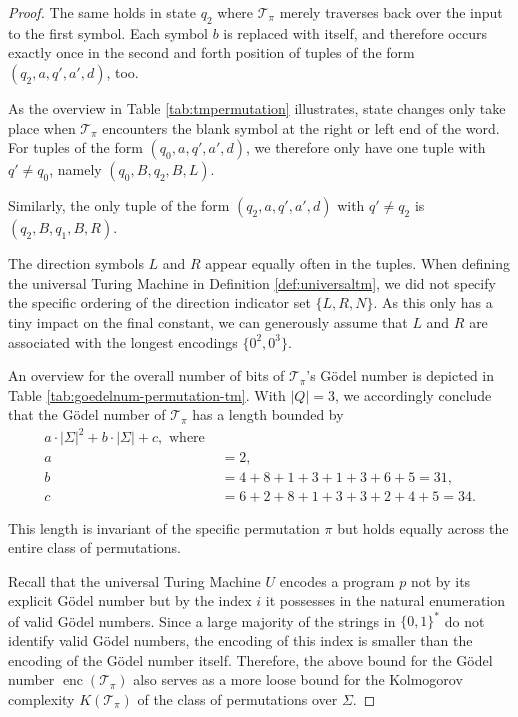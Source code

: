 \begin{proof}
	The same holds in state $q_2$ where $\mathcal{T}_\pi$ merely traverses back over the input to the first symbol. Each symbol $b$ is replaced with itself, and therefore occurs exactly once in the second and forth position of tuples of the form $(q_2,a,q',a',d)$, too.
	
	As the overview in Table \ref{tab:tmpermutation} illustrates, state changes only take place when $\mathcal{T}_\pi$ encounters the blank symbol at the right or left end of the word. For tuples of the form $(q_0,a,q',a',d)$, we therefore only have one tuple with $q'\neq q_0$, namely $(q_0,B,q_2,B,L)$.
	
	Similarly, the only tuple of the form $(q_2,a,q',a',d)$ with $q'\neq q_2$ is $(q_2,B,q_1,B,R)$.
	
	The direction symbols $L$ and $R$ appear equally often in the tuples.
	When defining the universal Turing Machine in Definition \ref{def:universaltm}, we did not specify the specific ordering of the direction indicator set $\{L,R,N\}$. As this only has a tiny impact on the final constant, we can generously assume that $L$ and $R$ are associated with the longest encodings $\{0^2,0^3\}$.
	
	An overview for the overall number of bits of $\mathcal{T}_\pi$'s G\"odel number is depicted in Table \ref{tab:goedelnum-permutation-tm}.
	With $|Q|=3$, we accordingly conclude that the G\"odel number of $\mathcal{T}_\pi$ has a length bounded by
	\begin{align}
		a\cdot |\Sigma|^2+b\cdot|\Sigma|+c, \text{ where } &\\
		a&=2,\\
		b&=4+8+1+3+1+3+6+5=31,\\
		c&=6+2+8+1+3+3+2+4+5=34.
	\end{align}
	
	This length is invariant of the specific permutation $\pi$ but holds equally across the entire class of permutations.
	
	Recall that the universal Turing Machine $U$ encodes a program $p$ not by its explicit G\"odel number but by the index $i$ it possesses in the natural enumeration of valid G\"odel numbers.
	Since a large majority of the strings in $\{0,1\}^{*}$ do not identify valid G\"odel numbers, the encoding of this index is smaller than the encoding of the G\"odel number itself.
	Therefore, the above bound for the G\"odel number $\operatorname{enc}(\mathcal{T}_\pi)$ also serves as a more loose bound for the Kolmogorov complexity $K(\mathcal{T}_\pi)$ of the class of permutations over $\Sigma$.
\end{proof}
